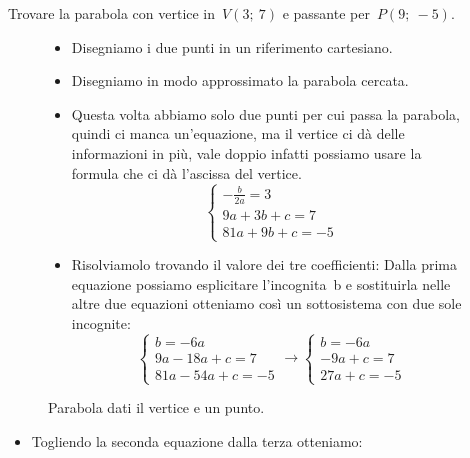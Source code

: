 \begin{esempio}
 Trovare la parabola con vertice in~\(V(3;~7)\) e passante per~\(P(9;~-5)\).
 
\begin{figure}[h]
\begin{minipage}{.60\textwidth}
 \begin{itemize}
  \item Disegniamo i due punti in un riferimento cartesiano.
  \item Disegniamo in modo approssimato la parabola cercata.
  \item Questa volta abbiamo solo due punti per cui passa la parabola, quindi
   ci manca un'equazione, ma il vertice ci dà delle informazioni in più, 
   vale doppio infatti possiamo usare la formula che ci dà l'ascissa del 
   vertice.
\[\left\{\begin{array}{l}
  -\frac{b}{2a}=3\\
  9a+3b+c=7\\
  81a+9b+c=-5
\end{array}\right. \]
  \item Risolviamolo trovando il valore dei tre coefficienti:
   Dalla prima equazione possiamo esplicitare l'incognita~b e sostituirla
   nelle altre due equazioni otteniamo così un sottosistema con due sole 
   incognite:
\[\left\{\begin{array}{l}
  b=-6a \\
  9a-18a+c=7\\
  81a-54a+c=-5
\end{array}\right. \rightarrow 
\left\{\begin{array}{l}
  b=-6a \\
  -9a+c=7\\
  27a+c=-5
\end{array}\right.\]
 \end{itemize}

\end{minipage}
\begin{minipage}{.40\textwidth}
\begin{inaccessibleblock}[Parabola di equazione \(y=x^2\).]
\centering
  \parabolaverticepunto
  \caption{Parabola dati il vertice e un punto.} 
\label{fig:parabola_parabolaverticepunto}
\end{inaccessibleblock}
\end{minipage}
\end{figure}

  \begin{itemize}
  \item Togliendo la seconda equazione dalla terza otteniamo: 


\end{itemize}
\end{esempio}
